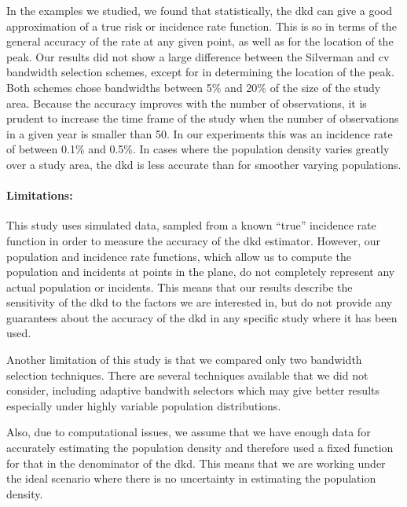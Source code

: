 \begin{onehalfspace}
In the examples we studied,
we found that statistically,
the \acrlong{dkd} can give a good approximation of a true risk or incidence rate function.
This is so in terms of the general accuracy of the rate at any given point,
as well as for the location of the peak.
Our results did not show a large difference between the Silverman and \acrlong{cv} bandwidth selection schemes,
except for in determining the location of the peak.
Both schemes chose bandwidths between 5\% and 20\% of the size of the study area.
Because the accuracy improves with the number of observations,
it is prudent to increase the time frame of the study when the number of observations in a given year is smaller than 50.
In our experiments this was an incidence rate of between 0.1\% and 0.5\%.
In cases where the population density varies greatly over a study area,
the \acrlong{dkd} is less accurate than for smoother varying populations.

\paragraph*{Limitations:}

This study uses simulated data,
sampled from a known ``true'' incidence rate function in order to measure the accuracy of the \acrlong{dkd} estimator.
However,
our population and incidence rate functions,
which allow us to compute the population and incidents at points in the plane,
do not completely represent any actual population or incidents.
This means that our results describe the sensitivity of the \acrlong{dkd} to the factors we are interested in,
but do not provide any guarantees about the accuracy of the \acrlong{dkd} in any specific study where it has been used.

Another limitation of this study is that we compared only two bandwidth selection techniques.
There are several techniques available that we did not consider,
including adaptive bandwith selectors which may give better results especially under highly variable population distributions.

Also, due to computational issues,
we assume that we have enough data for accurately estimating the population density and therefore used a fixed function for that in the denominator of the \gls{dkd}.
This means that we are working under the ideal scenario where there is no uncertainty in estimating the population density.


\end{onehalfspace}